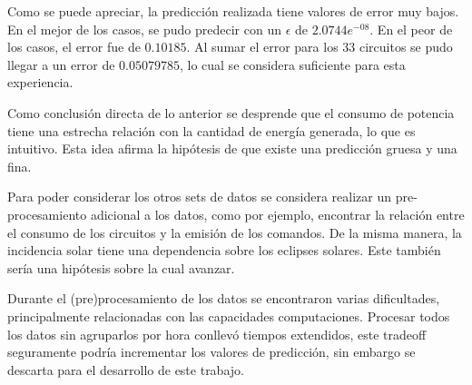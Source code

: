 \documentclass[../Main.tex]{subfiles}
\begin{document}
Como se puede apreciar, la predicción realizada tiene valores de error muy bajos. En el mejor de los casos, se pudo predecir con un $\epsilon$ de $2.0744e^{-08}$. En el peor de los casos, el error fue de $0.10185$. Al sumar el error para los 33 circuitos se pudo llegar a un error de $0.05079785$, lo cual se considera suficiente para esta experiencia.
\newline \par
Como conclusión directa de lo anterior se desprende que el consumo de potencia tiene una estrecha relación con la cantidad de energía generada, lo que es intuitivo. Esta idea afirma la hipótesis de que existe una predicción gruesa y una fina. 
\newline \par
Para poder considerar los otros sets de datos se considera realizar un pre-procesamiento adicional a los datos, como por ejemplo, encontrar la relación entre el consumo de los circuitos y la emisión de los comandos. De la misma manera, la incidencia solar tiene una dependencia sobre los eclipses solares. Este también sería una hipótesis sobre la cual avanzar.
\newline \par
Durante el (pre)procesamiento de los datos se encontraron varias dificultades, principalmente relacionadas con las capacidades computaciones. Procesar todos los datos sin agruparlos por hora conllevó tiempos extendidos, este tradeoff seguramente podría incrementar los valores de predicción, sin embargo se descarta para el desarrollo de este trabajo.
\end{document}
